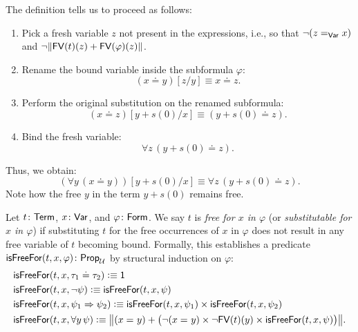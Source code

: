 \begin{xmpl}
\begin{description}[font=\normalfont\scshape]
        The definition tells us to proceed as follows:
        \begin{enumerate}[1)]
            \item Pick a fresh variable $z$ not present in the expressions, i.e., so that $\neg(z\mathrel{=_{\mathsf{Var}}}x)$ and $\neg\lVert\mathsf{FV}(t)(z)+\mathsf{FV}(\varphi)(z)\rVert$.
            \item Rename the bound variable inside the subformula $\varphi$:
            \[
                (x\doteq y)[z/y]\equiv x\doteq z.
            \]
            \item Perform the original substitution on the renamed subformula:
            \[
                (x\doteq z)[y+s(0)/x]
                    \equiv(y+s(0)\doteq z).
            \]
            \item Bind the fresh variable:
            \[
                \forall z\,(y+s(0)\doteq z).
            \]
        \end{enumerate}
        Thus, we obtain:
        \[
            (\forall y\,(x\doteq y))[y+s(0)/x]
                \equiv\forall z\,(y+s(0)\doteq z).
        \]
        Note how the free $y$ in the term $y+s(0)$ remains free.
    \end{description}
\end{xmpl}

\begin{defn}\label{defn:free-for-in}
    Let $t\colon\fun{Term}$, $x\colon\fun{Var}$, and $\varphi\colon\fun{Form}$. We say $t$ is \textsl{free for $x$ in $\varphi$} (or \textsl{substitutable for $x$ in $\varphi$}) if substituting $t$ for the free occurrences of $x$ in $\varphi$ does not result in any free variable of $t$ becoming bound. Formally, this establishes a predicate $\fun{isFreeFor}(t,x,\varphi)\colon\fun{Prop}_\univ$ by structural induction on $\varphi$:
    \begin{align*}
        &\mathsf{isFreeFor}(t,x,\tau_1\doteq\tau_2)
            \mathrel{\vcentcolon}\equiv\mathsf{1}\\
        &\mathsf{isFreeFor}(t,x,\neg\psi)
            \mathrel{\vcentcolon}\equiv\mathsf{isFreeFor}(t,x,\psi)\\
        &\mathsf{isFreeFor}(t,x,\psi_1\mathrel{\Rightarrow}\psi_2)
            \mathrel{\vcentcolon}\equiv\mathsf{isFreeFor}(t,x,\psi_1)
            \times
            \mathsf{isFreeFor}(t,x,\psi_2)\\
        &\mathsf{isFreeFor}(t,x,\forall y\,\psi)
            \mathrel{\vcentcolon}\equiv\big\lVert(x\mathrel{=_{}}y)
            +
            \bigl(
                \neg(x\mathrel{=_{}}y)\times\neg\mathsf{FV}(t)(y)
                \times
                \mathsf{isFreeFor}(t,x,\psi)
            \bigr)\big\rVert.
    \end{align*}
\end{defn}

